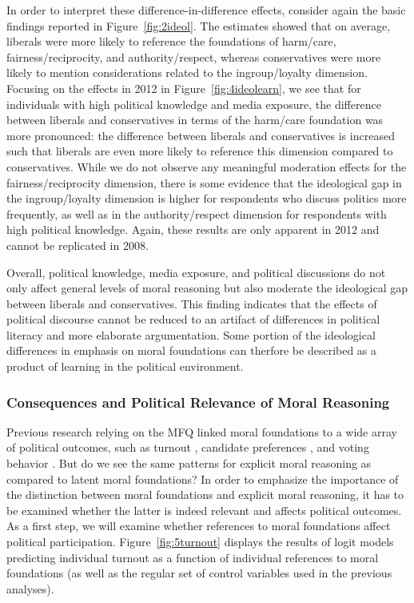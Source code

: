 \documentclass[12pt]{article}
\begin{document}
In order to interpret these difference-in-difference effects, consider again the basic findings reported in Figure~\ref{fig:2ideol}. The estimates showed that on average, liberals were more likely to reference the foundations of harm/care, fairness/reciprocity, and authority/respect, whereas conservatives were more likely to mention considerations related to the ingroup/loyalty dimension. Focusing on the effects in 2012 in Figure~\ref{fig:4ideolearn}, we see that for individuals with high political knowledge and media exposure, the difference between liberals and conservatives in terms of the harm/care foundation was more pronounced: the difference between liberals and conservatives is increased such that liberals are even more likely to reference this dimension compared to conservatives. While we do not observe any meaningful moderation effects for the fairness/reciprocity dimension, there is some evidence that the ideological gap in the ingroup/loyalty dimension is higher for respondents who discuss politics more frequently, as well as in the authority/respect dimension for respondents with high political knowledge. Again, these results are only apparent in 2012 and cannot be replicated in 2008.

Overall, political knowledge, media exposure, and political discussions do not only affect general levels of moral reasoning but also moderate the ideological gap between liberals and conservatives. This finding indicates that the effects of political discourse cannot be reduced to an artifact of differences in political literacy and more elaborate argumentation. Some portion of the ideological differences in emphasis on moral foundations can therfore be described as a product of learning in the political environment.


\subsubsection{Consequences and Political Relevance of Moral Reasoning}

Previous research relying on the MFQ linked moral foundations to a wide array of political outcomes, such as turnout \citep{johnson2014ideology}, candidate preferences \citep{iyer2010beyond}, and voting behavior \citep{franks2015using}. But do we see the same patterns for explicit moral reasoning as compared to latent moral foundations? In order to emphasize the importance of the distinction between moral foundations and explicit moral reasoning, it has to be examined whether the latter is indeed relevant and affects political outcomes. As a first step, we will examine whether references to moral foundations affect political participation. Figure~\ref{fig:5turnout} displays the results of logit models predicting individual turnout as a function of individual references to moral foundations (as well as the regular set of control variables used in the previous analyses).
\end{document}
